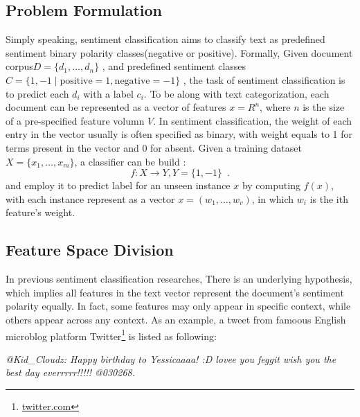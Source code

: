 \documentclass{llncs}
\begin{document}
\subsection{Problem Formulation}
Simply speaking, sentiment classification aims to classify text as predefined sentiment binary polarity classes(negative or positive).  
Formally, Given document corpus$ D=\lbrace d_{1},\dots ,d_{n} \rbrace$ , and predefined sentiment classes$ C=\lbrace 1,-1\mid\mathrm{positive}=1,\mathrm{negative}=-1 \rbrace$ , the task of sentiment classification is to predict each $ d_{i} $ with a label $ c_{i} $. 
To be along with text categorization, each document can be represented as a vector of features $ x=R^{n} $, where $ n $ is the size of a pre-specified feature volumn $ V $. 
In sentiment classification, the weight of each entry in the vector usually is often specified as binary, with weight equals to 1 for terms present in the vector and 0 for absent. 
Given a training dataset $ X=\lbrace x_{1},\dots,x_{m} \rbrace $, a classifier can be build :
\begin{equation}
  f:X \longrightarrow Y, Y=\lbrace 1,-1 \rbrace \enspace .
\end{equation} 
and employ it to predict label for an unseen instance $ x $ by computing $ f \left( x \right)   $, with each instance represent as a vector $ x=\left( w_{1},\dots,w_{v} \right)  $, in which $ w_{i} $ is the ith feature’s weight.
\subsection{Feature Space Division}
In previous sentiment classification researches, There is an underlying hypothesis, which implies all features in the text vector represent the document’s sentiment polarity equally. 
In fact, some features may only appear in specific context, while others appear across any context. 
As an example, a tweet from famoous English microblog platform Twitter\footnote{\url{twitter.com}} is listed as following:

\textit{@Kid\_Cloudz: Happy birthday to Yessicaaaa! :D lovee you feggit wish you the best day everrrrr!!!!! @030268.}
\end{document}

